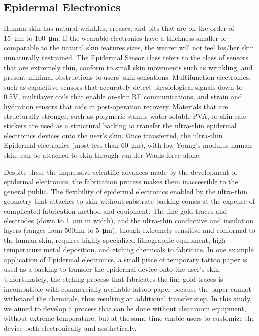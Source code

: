 \documentclass{sigchi}
\begin{document}
\subsection{Epidermal Electronics}
Human skin has natural wrinkles, creases, and pits that are on the order of \SI{15}{\micro\metre} to \SI{100}{\micro\metre}. If the wearable electronics have a thickness smaller or comparable to the natural skin features sizes, the wearer will not feel his/her skin unnaturally restrained. The Epidermal Sensor class refers to the class of sensors that are extremely thin, conform to small skin movements such as wrinkling, and present minimal obstructions to users’ skin sensations. Multifunction electronics, such as capacitive sensors that accurately detect physiological signals down to 0.5V, multilayer coils that enable on-skin RF communications, and strain and hydration sensors that aids in post-operation recovery. %
Materials that are structurally stronger, such as polymeric stamp, water-soluble PVA, or skin-safe stickers are used as a structural backing to transfer the ultra-thin epidermal electronics devices onto the user's skin. Once transferred, the ultra-thin Epidermal electronics (most less than \SI{60}{\micro\metre}), with low Young's modulus %
 human skin, can be attached to skin through van der Waals force alone. 

Despite these the impressive scientific advances made by the development of epidermal electronics, the fabrication process makes them inaccessible to the general public. The flexibility of epidermal electronics enabled by the ultra-thin geometry that attaches to skin without substrate backing comes at the expense of complicated fabrication method and equipment. The fine gold traces and electrodes (down to \SI{1}{\micro\metre} in width), and the ultra-thin conductive and insulation layers (ranges from 500nm to 5\SI{}{\micro\metre}), though extremely sensitive and conformal to the human skin, requires highly specialized lithographic equipment, high temperature metal deposition, and etching chemicals to fabricate. In one example application of Epidermal electronics, a small piece of temporary tattoo paper is used as a backing to transfer the epidermal device onto the user's skin. Unfortunately, the etching process that fabricates the fine gold traces is incompatible with commercially available tattoo paper because the paper cannot withstand the chemicals, thus resulting an additional transfer step. In this study, we aimed to develop a process that can be done without cleanroom equipment, without
 extreme temperature, but at the same time enable users to customize the device both electronically and aesthetically. 
\end{document}
